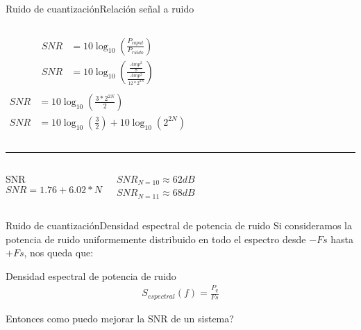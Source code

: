  \begin{frame}{Ruido de cuantización}{Relación señal a ruido}
    \begin{columns}[onlytextwidth]
       \begin{align*}
          SNR&=10 \log_{10} \left(\frac{P_{input}}{P_{ruido}} \right)\\
          SNR&=10 \log_{10}\left(\frac{\frac{Amp^2}{8}}{\frac{Amp^2}{12*2^{2N}}} \right) \\
       \end{align*}
       \begin{align*}
          SNR&=10 \log_{10}\left(\frac{3*2^{2N}}{2} \right)\\
          SNR&=10\log_{10}\left(\frac{3}{2}\right)+10\log_{10}\left(2^{2N}\right)
       \end{align*}
    \end{columns}
   \hrule
    \begin{columns}[c]
       \begin{block}{SNR}
          \begin{equation*}
             SNR = 1.76 + 6.02 * N
          \end{equation*}
       \end{block}
    \begin{center}
       {$SNR_{N=10} \approx 62dB$} \\
       {$SNR_{N=11} \approx 68dB$}
    \end{center}
    \end{columns}
    \vspace{3cm}
 \end{frame}
 \begin{frame}{Ruido de cuantización}{Densidad espectral de potencia de ruido}
    Si consideramos la potencia de ruido uniformemente distribuido en todo el espectro desde $-Fs$ hasta $+Fs$, nos queda que:
    \begin{block}{Densidad espectral de potencia de ruido}
       \begin{align*}
          S_{espectral}(f) = \frac{P_q}{Fs}
       \end{align*}
    \end{block}
    Entonces como puedo mejorar la SNR de un sistema?
    \vfill
 \end{frame}
